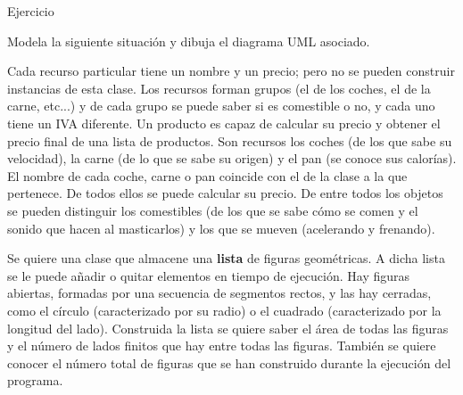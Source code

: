 \documentclass[10pt, envcountsect , spanish]{beamer}
\begin{document}
\begin{frame}{Ejercicio} 
\footnotesize


\begin{ejercicio}{} Modela la siguiente situación y dibuja el diagrama UML asociado.

Cada recurso particular tiene un nombre y un precio; pero no se pueden construir instancias de esta clase. Los recursos forman grupos (el de los coches, el de la carne, etc...) y de cada grupo se puede saber si es comestible o no, y cada uno tiene un IVA diferente. 
Un producto es capaz de calcular su precio  y obtener el precio final de una lista de productos.
Son recursos los coches (de los que sabe su velocidad), la carne (de lo que se sabe su origen) y el pan (se conoce sus calorías).   El nombre de cada coche, carne o pan coincide con el de la clase a la que pertenece. 
De todos ellos se puede calcular su precio.
De entre todos los objetos se pueden distinguir  los comestibles (de los que se sabe cómo se comen y el sonido que hacen al masticarlos) y los que se mueven (acelerando y frenando).
\end{ejercicio}

\begin{ejercicio}{}
Se quiere una clase que almacene una \textbf{lista} de figuras geométricas. A dicha lista se le puede añadir o quitar elementos en tiempo de ejecución.
Hay figuras abiertas, formadas por una secuencia de segmentos rectos, y las hay cerradas, como el círculo (caracterizado por su radio) o el cuadrado (caracterizado por la longitud del lado). 
Construida la lista se quiere saber el área de todas las figuras y el número de lados finitos que hay entre todas las figuras. También se quiere conocer el número total de figuras que se han construido durante la ejecución del programa.
\end{ejercicio}

\end{frame}

%
%
%
%
%
%
%
%
\end{document}
